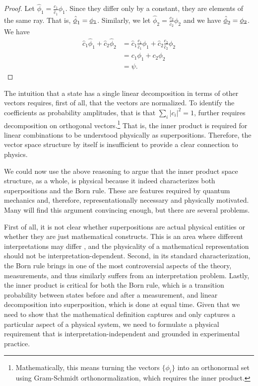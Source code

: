 \documentclass[10pt,twocolumn, nofootinbib]{revtex4-2}
\begin{document}
\begin{proof}
Let $\hat{\phi}_1 = \frac{c_1}{\hat{c}_1} \phi_1$. Since they differ only by a constant, they are elements of the same ray. That is, $\underbar{$\hat{\phi}$}_1 = \underbar{$\phi_1$}$. Similarly, we let $\hat{\phi}_2 = \frac{c_2}{\hat{c}_2} \phi_2$ and we have $\underbar{$\hat{\phi}$}_2 = \underbar{$\phi_2$}$. We have
\begin{equation}
\begin{aligned}
\hat{c}_1 \hat{\phi}_1 + \hat{c}_2 \hat{\phi}_2 &= \hat{c}_1 \frac{c_1}{\hat{c}_1} \phi_1 + \hat{c}_2 \frac{c_2}{\hat{c}_2} \phi_2 \\
&= c_1 \phi_1 + c_2 \phi_2 \\
&= \psi.
\end{aligned}
\end{equation}
\end{proof}

The intuition that a state has a single linear decomposition in terms of other vectors requires, first of all, that the vectors are normalized. To identify the coefficients as probability amplitudes, that is that $\sum_i |c_i|^2 = 1$, further requires decomposition on orthogonal vectors.\footnote{Mathematically, this means turning the vectors $\{\phi_i\}$ into an orthonormal set using Gram-Schmidt orthonormalization, which requires the inner product.} That is, the inner product is required for linear combinations to be understood physically as superpositions. Therefore, the vector space structure by itself is insufficient to provide a clear connection to physics.

We could now use the above reasoning to argue that the inner product space structure, as a whole, is physical because it indeed characterizes both superpositions and the Born rule. These are features required by quantum mechanics and, therefore, representationally necessary and physically motivated. Many will find this argument convincing enough, but there are several problems.

First of all, it is not clear whether superpositions are actual physical entities or whether they are just mathematical constructs. This is an area where different interpretations may differ \cite{albert_quantum_1994, wallace_everett_2013, howard_complementarity_2021}, and the physicality of a mathematical representation should not be interpretation-dependent. Second, in its standard characterization, the Born rule brings in one of the most controversial aspects of the theory, measurements, and thus similarly suffers from an interpretation problem. Lastly, the inner product is critical for both the Born rule, which is a transition probability between states before and after a measurement, and linear decomposition into superposition, which is done at equal time. Given that we need to show that the mathematical definition captures and only captures a particular aspect of a physical system, we need to formulate a physical requirement that is interpretation-independent and grounded in experimental practice.
\end{document}
